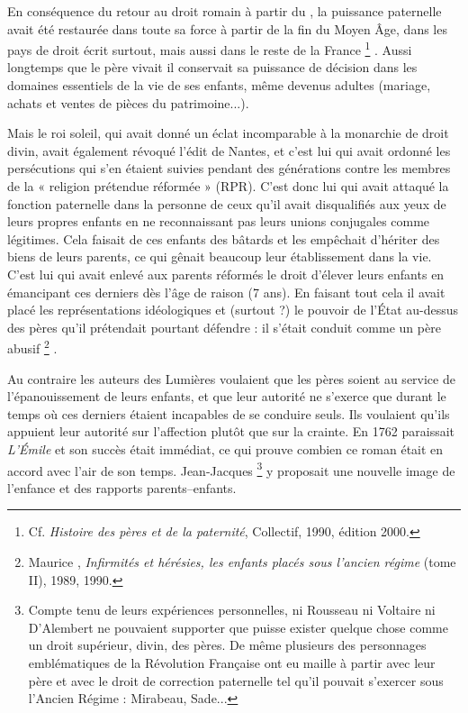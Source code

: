  En conséquence du retour au droit romain à partir du , la puissance paternelle avait été restaurée dans toute sa force à partir de la fin du Moyen Âge, dans les pays de droit écrit surtout, mais aussi dans le reste de la France%
\footnote{Cf. \emph{Histoire des pères et de la paternité}, Collectif, 1990, édition 2000.}%
. Aussi longtemps que le père vivait il conservait sa puissance de décision dans les domaines essentiels de la vie de ses enfants, même devenus adultes (mariage, achats et ventes de pièces du patrimoine...). 

 Mais le roi soleil, qui avait donné un éclat incomparable à la monarchie de droit divin, avait également révoqué l'édit de Nantes, et c'est lui qui avait ordonné les persécutions qui s'en étaient suivies pendant des générations contre les membres de la « {religion prétendue réformée} » (RPR). C'est donc lui qui avait attaqué la fonction paternelle dans la personne de ceux qu'il avait disqualifiés aux yeux de leurs propres enfants en ne reconnaissant pas leurs unions conjugales comme légitimes. Cela faisait de ces enfants des bâtards et les empêchait d'hériter des biens de leurs parents, ce qui gênait beaucoup leur établissement dans la vie. C'est lui qui avait enlevé aux parents réformés le droit d'élever leurs enfants en émancipant ces derniers dès l'âge de raison (7 ans). En faisant tout cela il avait placé les représentations idéologiques et (surtout ?) le pouvoir de l'État au-dessus des pères qu'il prétendait pourtant défendre : il s'était conduit comme un père abusif%
\footnote{Maurice , \emph{Infirmités et hérésies, les enfants placés sous l'ancien régime} (tome II), 1989, 1990.}%
.


 Au contraire les auteurs des Lumières voulaient que les pères soient au service de l'épanouissement de leurs enfants, et que leur autorité ne s'exerce que durant le temps où ces derniers étaient incapables de se conduire seuls. Ils voulaient qu'ils appuient leur autorité sur l'affection plutôt que sur la crainte. En 1762 paraissait \emph{L'Émile} et son succès était immédiat, ce qui prouve combien ce roman était en accord avec l'air de son temps. Jean-Jacques %
\footnote{Compte tenu de leurs expériences personnelles, ni Rousseau ni Voltaire ni D'Alembert ne pouvaient supporter que puisse exister quelque chose comme un droit supérieur, divin, des pères. De même plusieurs des personnages emblématiques de la Révolution Française ont eu maille à partir avec leur père et avec le droit de correction paternelle tel qu'il pouvait s'exercer sous l'Ancien Régime : Mirabeau, Sade...} 
y proposait une nouvelle image de l'enfance et des rapports parents--enfants. 

